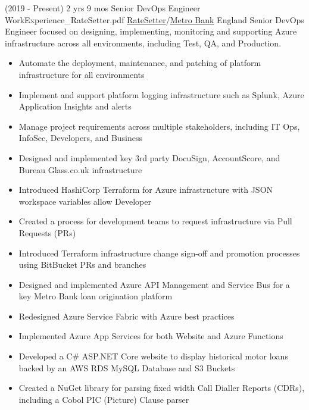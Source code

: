 
\begin{twenty}
\twentyitem
  {(2019 - Present) 2 yrs 9 mos}
  {Senior DevOps Engineer}
  {WorkExperience_RateSetter.pdf}
  {\href{https://www.ratesetter.com/}{RateSetter}/\href{https://metrobankonline.co.uk}{Metro Bank}}
  {England}
  {Senior DevOps Engineer focused on designing, implementing, monitoring and supporting Azure infrastructure across all environments, including Test, QA, and Production.}
  {\begin{itemize}
    \item Automate the deployment, maintenance, and patching of platform infrastructure for all environments
    \item Implement and support platform logging infrastructure such as Splunk, Azure Application Insights and alerts
    \item Manage project requirements across multiple stakeholders, including IT Ops, InfoSec, Developers, and Business
  \end{itemize}}
  {\begin{itemize}
    \item Designed and implemented key 3rd party DocuSign, AccountScore, and Bureau Glass.co.uk infrastructure
    \item Introduced HashiCorp Terraform for Azure infrastructure with JSON workspace variables allow Developer
    \item Created a process for development teams to request infrastructure via Pull Requests (PRs)
    \item Introduced Terraform infrastructure change sign-off and promotion processes using BitBucket PRs and branches
    \item Designed and implemented Azure API Management and Service Bus for a key Metro Bank loan origination platform
    \item Redesigned Azure Service Fabric with Azure best practices
    \item Implemented Azure App Services for both Website and Azure Functions
    \item Developed a C\# ASP.NET Core website to display historical motor loans backed by an AWS RDS MySQL Database and S3 Buckets
    \item Created a NuGet library for parsing fixed width Call Dialler Reports (CDRs), including a Cobol PIC (Picture) Clause parser
  \end{itemize}}
\end{twenty}


